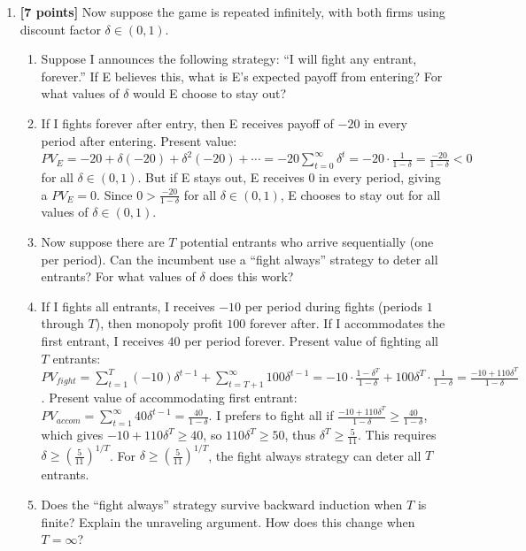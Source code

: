 \documentclass[11pt]{article}
\begin{document}
\begin{enumerate}[label=(\alph*)]
    \item \textbf{[7 points]} Now suppose the game is repeated infinitely, with both firms using discount factor $\delta \in (0, 1)$.
    \begin{enumerate}[label=(\roman*)]
        \item Suppose I announces the following strategy: ``I will fight any entrant, forever.'' If E believes this, what is E's expected payoff from entering? For what values of $\delta$ would E choose to stay out?
        \item[] If I fights forever after entry, then E receives payoff of $-20$ in every period after entering. Present value: $PV_E=-20+\delta(-20)+\delta^2(-20)+\cdots=-20\sum_{t=0}^{\infty}\delta^t=-20\cdot\frac{1}{1-\delta}=\frac{-20}{1-\delta}<0$ for all $\delta\in(0,1)$. But if E stays out, E receives $0$ in every period, giving a  $PV_E=0$. Since $0>\frac{-20}{1-\delta}$ for all $\delta\in(0,1)$, E chooses to stay out for all values of $\delta\in(0,1)$.
        \item Now suppose there are $T$ potential entrants who arrive sequentially (one per period). Can the incumbent use a ``fight always'' strategy to deter all entrants? For what values of $\delta$ does this work?
        \item[] If I fights all entrants, I receives $-10$ per period during fights (periods $1$ through $T$), then monopoly profit $100$ forever after. If I accommodates the first entrant, I receives $40$ per period forever. Present value of fighting all $T$ entrants: $PV_{fight}=\sum_{t=1}^{T}(-10)\delta^{t-1}+\sum_{t=T+1}^{\infty}100\delta^{t-1}=-10\cdot\frac{1-\delta^T}{1-\delta}+100\delta^T\cdot\frac{1}{1-\delta}=\frac{-10+110\delta^T}{1-\delta}$. Present value of accommodating first entrant: $PV_{accom}=\sum_{t=1}^{\infty}40\delta^{t-1}=\frac{40}{1-\delta}$. I prefers to fight all if $\frac{-10+110\delta^T}{1-\delta}\geq\frac{40}{1-\delta}$, which gives $-10+110\delta^T\geq40$, so $110\delta^T\geq50$, thus $\delta^T\geq\frac{5}{11}$. This requires $\delta\geq\left(\frac{5}{11}\right)^{1/T}$. For $\delta\geq\left(\frac{5}{11}\right)^{1/T}$, the fight always strategy can deter all $T$ entrants.
        \item Does the ``fight always'' strategy survive backward induction when $T$ is finite? Explain the unraveling argument. How does this change when $T = \infty$?

\end{enumerate}
\end{enumerate}
\end{document}
